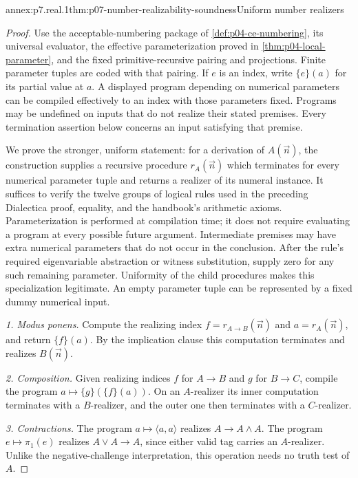 \begin{annexitem}{annex:p7.real.1}{thm:p07-number-realizability-soundness}{Uniform number realizers}
\begin{proof}
Use the acceptable-numbering package of \cref{def:p04-ce-numbering},
its universal evaluator, the effective parameterization proved in
\cref{thm:p04-local-parameter}, and the fixed primitive-recursive
pairing and projections. Finite parameter tuples are coded with that
pairing. If \(e\) is an index, write \(\{e\}(a)\) for its
partial value at \(a\). A displayed program depending on numerical
parameters can be compiled effectively to an index with those parameters
fixed. Programs may be undefined on inputs that do not realize their
stated premises. Every termination assertion below concerns an input
satisfying that premise.

We prove the stronger, uniform statement: for a derivation of
\(A(\vec n)\), the construction supplies a recursive procedure
\(r_A(\vec n)\) which terminates for every numerical parameter tuple
and returns a realizer of its numeral instance. It suffices to verify
the twelve groups of logical rules used in the preceding Dialectica
proof, equality, and the handbook's arithmetic axioms. Parameterization
is performed at compilation time; it does not require evaluating a
program at every possible future argument. Intermediate premises may
have extra numerical parameters that do not occur in the conclusion.
After the rule's required eigenvariable abstraction or witness
substitution, supply zero for any such remaining parameter. Uniformity
of the child procedures makes this specialization legitimate. An empty
parameter tuple can be represented by a fixed dummy numerical input.

\emph{1. Modus ponens.} Compute the realizing index
\(f=r_{A\to B}(\vec n)\) and \(a=r_A(\vec n)\), and return
\(\{f\}(a)\). By the implication clause this computation terminates
and realizes \(B(\vec n)\).

\emph{2. Composition.} Given realizing indices \(f\) for
\(A\to B\) and \(g\) for \(B\to C\), compile the program
\(a\mapsto\{g\}(\{f\}(a))\). On an \(A\)-realizer its
inner computation terminates with a \(B\)-realizer, and the outer
one then terminates with a \(C\)-realizer.

\emph{3. Contractions.} The program \(a\mapsto\langle a,a\rangle\)
realizes \(A\to A\land A\). The program
\(e\mapsto\pi_1(e)\) realizes \(A\lor A\to A\), since either
valid tag carries an \(A\)-realizer. Unlike the negative-challenge
interpretation, this operation needs no truth test of \(A\).


\end{proof}
\end{annexitem}
